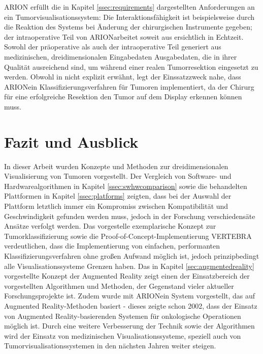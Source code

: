 \documentclass[pdftex,a4paper,titlepage,12pt]{scrartcl}
\newtheorem[L]{boxedDefinition}{Definition}
\begin{document}
ARION erfüllt die in Kapitel \ref{ssec:requirements} dargestellten Anforderungen an ein Tumorvisualisationssystem: Die Interaktionsfähigkeit ist beispielsweise durch die Reaktion des Systems bei Änderung der chirurgischen Instrumente gegeben; der intraoperative Teil von ARION\texttrademark arbeitet soweit aus \cite{Suthau2002DE} ersichtlich in Echtzeit. Sowohl der präoperative  als auch der intraoperative Teil generiert aus medizinischen, dreidimensionalen Eingabedaten Ausgabedaten, die in ihrer Qualität ausreichend sind, um während einer realen Tumorresektion eingesetzt zu werden. Obwohl in \cite{Suthau2002DE} nicht explizit erwähnt, legt der Einssatzzweck nahe, dass ARION\texttrademark ein Klassifizierungsverfahren für Tumoren implementiert, da der Chirurg für eine erfolgreiche Resektion den Tumor auf dem Display erkennen können muss.

\section{Fazit und Ausblick}\label{sec:facit}
In dieser Arbeit wurden Konzepte und Methoden zur dreidimensionalen Visualisierung von Tumoren vorgestellt.
Der Vergleich von Software- und Hardwarealgorithmen in Kapitel \ref{ssec:swhwcomparison} sowie die behandelten Plattformen in Kapitel \ref{ssec:platforms} zeigten, dass bei der Auswahl der Plattform letztlich immer ein Kompromiss zwischen Kompatibilität und Geschwindigkeit gefunden werden muss, jedoch in der Forschung verschiedensäte Ansätze verfolgt werden. Das vorgestelle exemplarische Konzept zur Tumorklassifizierung sowie die Proof-of-Concept-Implementierung VERTEBRA verdeutlichen, dass die Implementierung von einfachen, performanten Klassifizierungsverfahren ohne großen Aufwand möglich ist, jedoch prinzipbedingt alle Visualisationssysteme Grenzen haben.
Das in Kapitel \ref{sec:augmentedreality} vorgestellte Konzept der Augmented Reality zeigt einen der Einsatzbereich der vorgestellten Algorithmen und Methoden, der Gegenstand vieler aktueller Forschungsprojekte ist. Zudem wurde mit ARION\texttrademark ein System vorgestellt, das auf Augmented Reality-Methoden basiert - dieses zeigte schon 2002, dass der Einsatz von Augmented Reality-basierenden Systemen für onkologische Operationen möglich ist. Durch eine weitere Verbesserung der Technik sowie der Algorithmen wird der Einsatz von medizinischen Visualisationssysteme, speziell auch von Tumorvisualisationssystemen in den nächsten Jahren weiter steigen.

\appendix \label{appendixstart}
\end{document}
